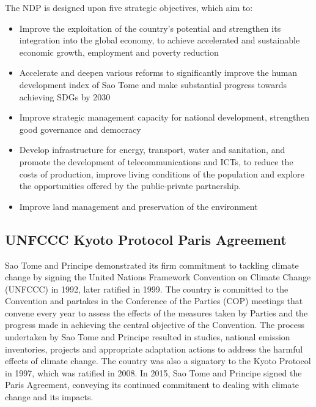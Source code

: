 \documentclass[
]{book}
\providecommand{\tightlist}{%
  \setlength{\itemsep}{0pt}\setlength{\parskip}{0pt}}
\begin{document}
The NDP is designed upon five strategic objectives, which aim to:

\begin{itemize}
\tightlist
\item
  Improve the exploitation of the country's potential and strengthen its integration into the global economy, to achieve accelerated and sustainable economic growth, employment and poverty reduction
\item
  Accelerate and deepen various reforms to significantly improve the human development index of Sao Tome and make substantial progress towards achieving SDGs by 2030
\item
  Improve strategic management capacity for national development, strengthen good governance and democracy
\item
  Develop infrastructure for energy, transport, water and sanitation, and promote the development of telecommunications and ICTs, to reduce the costs of production, improve living conditions of the population and explore the opportunities offered by the public-private partnership.
\item
  Improve land management and preservation of the environment
\end{itemize}

\hypertarget{unfccc-kyoto-protocol-paris-agreement}{%
\subsection{UNFCCC \textbar{} Kyoto Protocol \textbar{} Paris Agreement}\label{unfccc-kyoto-protocol-paris-agreement}}

Sao Tome and Principe demonstrated its firm commitment to tackling climate change by signing the United Nations Framework Convention on Climate Change (UNFCCC) in 1992, later ratified in 1999. The country is committed to the Convention and partakes in the Conference of the Parties (COP) meetings that convene every year to assess the effects of the measures taken by Parties and the progress made in achieving the central objective of the Convention. The process undertaken by Sao Tome and Principe resulted in studies, national emission inventories, projects and appropriate adaptation actions to address the harmful effects of climate change. The country was also a signatory to the Kyoto Protocol in 1997, which was ratified in 2008. In 2015, Sao Tome and Principe signed the Paris Agreement, conveying its continued commitment to dealing with climate change and its impacts.
\end{document}
